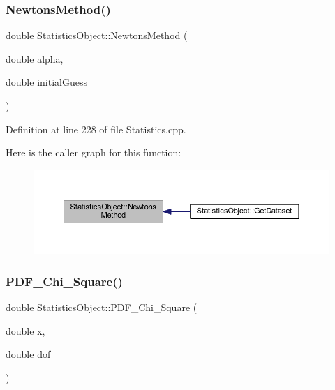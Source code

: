 \subsubsection{\texorpdfstring{Newtons\+Method()}{NewtonsMethod()}}
{\footnotesize\ttfamily double Statistics\+Object\+::\+Newtons\+Method (\begin{DoxyParamCaption}\item[{double}]{alpha,  }\item[{double}]{initial\+Guess }\end{DoxyParamCaption})\hspace{0.3cm}{\ttfamily [protected]}}



Definition at line 228 of file Statistics.\+cpp.

Here is the caller graph for this function\+:
\nopagebreak
\begin{figure}[H]
\begin{center}
\leavevmode
\includegraphics[width=350pt]{class_statistics_object_ade153b4af992cc1df2c515cde8e01ef9_icgraph}
\end{center}
\end{figure}
\mbox{\label{class_statistics_object_aec6848499139f4811fd4f2f60a252a9f}} 
\subsubsection{\texorpdfstring{P\+D\+F\+\_\+\+Chi\+\_\+\+Square()}{PDF\_Chi\_Square()}}
{\footnotesize\ttfamily double Statistics\+Object\+::\+P\+D\+F\+\_\+\+Chi\+\_\+\+Square (\begin{DoxyParamCaption}\item[{double}]{x,  }\item[{double}]{dof }\end{DoxyParamCaption})}



